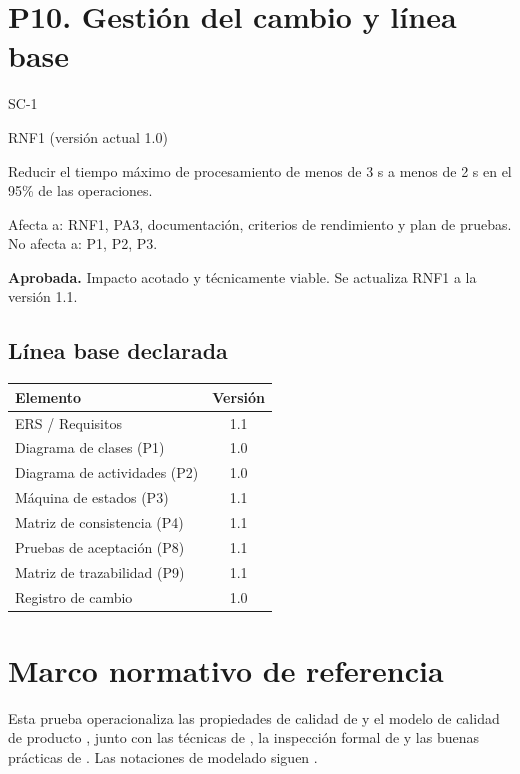 \documentclass[11pt,a4paper]{article}
\begin{document}
	\newpage
	\section{P10. Gestión del cambio y línea base}
	
	
	\begin{description}[leftmargin=2.2cm,style=nextline]
		\item[ID] SC-1
		\item[Requisito afectado] RNF1 (versión actual 1.0)
		\item[Cambio solicitado] Reducir el tiempo máximo de procesamiento de menos de 3 s a menos de
		2 s en el 95\% de las operaciones.
		\item[Análisis de impacto] Afecta a: RNF1, PA3, documentación, criterios de rendimiento y plan de
		pruebas. No afecta a: P1, P2, P3.
		\item[Decisión CCB] \textbf{Aprobada.} Impacto acotado y técnicamente viable. Se actualiza RNF1 a
		la versión 1.1.
	\end{description}
	
	\subsection*{Línea base declarada}
	\begin{center}
		\begin{tabular}{@{}lc@{}}
			\toprule
			Elemento & Versión \\
			\midrule
			ERS / Requisitos & 1.1 \\
			Diagrama de clases (P1) & 1.0 \\
			Diagrama de actividades (P2) & 1.0 \\
			Máquina de estados (P3) & 1.1 \\
			Matriz de consistencia (P4) & 1.1 \\
			Pruebas de aceptación (P8) & 1.1 \\
			Matriz de trazabilidad (P9) & 1.1 \\
			Registro de cambio & 1.0 \\
			\bottomrule
		\end{tabular}
	\end{center}
	
	\section*{Marco normativo de referencia}
	Esta prueba operacionaliza las propiedades de calidad de \citep{iso29148} y el modelo de calidad de
	producto \citep{iso25010}, junto con las técnicas de \citep{pohl2010}, la inspección formal de
	\citep{fagan1976} y las buenas prácticas de \citep{swebok2024}. Las notaciones de modelado siguen
	\citep{omguml}.
	
\end{document}
